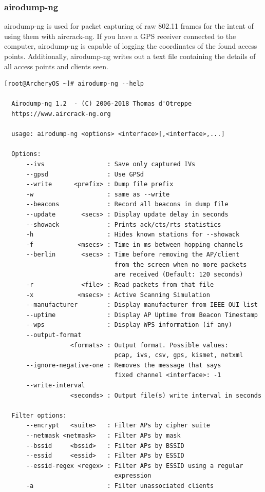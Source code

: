 \documentclass{article}
\begin{document}
\subsubsection{airodump-ng}
airodump-ng  is  used  for  packet  capturing of raw 802.11 frames for the intent of using them with aircrack-ng. If you have  a  GPS  receiver  connected  to the computer, airodump-ng is capable of logging the coordinates of the found access points. Additionally, airodump-ng writes  out  a  text file containing the details of all access points and clients seen.
\begin{lstlisting}
[root@ArcheryOS ~]# airodump-ng --help

  Airodump-ng 1.2  - (C) 2006-2018 Thomas d'Otreppe
  https://www.aircrack-ng.org

  usage: airodump-ng <options> <interface>[,<interface>,...]

  Options:
      --ivs                 : Save only captured IVs
      --gpsd                : Use GPSd
      --write      <prefix> : Dump file prefix
      -w                    : same as --write 
      --beacons             : Record all beacons in dump file
      --update       <secs> : Display update delay in seconds
      --showack             : Prints ack/cts/rts statistics
      -h                    : Hides known stations for --showack
      -f            <msecs> : Time in ms between hopping channels
      --berlin       <secs> : Time before removing the AP/client
                              from the screen when no more packets
                              are received (Default: 120 seconds)
      -r             <file> : Read packets from that file
      -x            <msecs> : Active Scanning Simulation
      --manufacturer        : Display manufacturer from IEEE OUI list
      --uptime              : Display AP Uptime from Beacon Timestamp
      --wps                 : Display WPS information (if any)
      --output-format
                  <formats> : Output format. Possible values:
                              pcap, ivs, csv, gps, kismet, netxml
      --ignore-negative-one : Removes the message that says
                              fixed channel <interface>: -1
      --write-interval
                  <seconds> : Output file(s) write interval in seconds

  Filter options:
      --encrypt   <suite>   : Filter APs by cipher suite
      --netmask <netmask>   : Filter APs by mask
      --bssid     <bssid>   : Filter APs by BSSID
      --essid     <essid>   : Filter APs by ESSID
      --essid-regex <regex> : Filter APs by ESSID using a regular
                              expression
      -a                    : Filter unassociated clients


\end{lstlisting}
\end{document}
